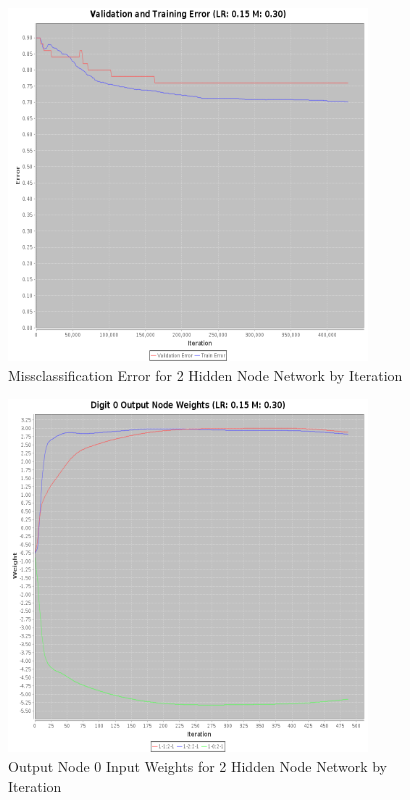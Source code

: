 \documentclass{article}
\begin{document}
\begin{figure}
\centering
\includegraphics[width=0.85\textwidth]{data/final/2_hidden_node_error.png}
\caption{Missclassification Error for 2 Hidden Node Network by Iteration}
\label{error2}
\end{figure}

\begin{figure}
\centering
\includegraphics[width=0.85\textwidth]{data/final/2_hidden_node_0weight.png}
\caption{Output Node 0 Input Weights for 2 Hidden Node Network by Iteration}
\label{weight2}
\end{figure}
\end{document}
